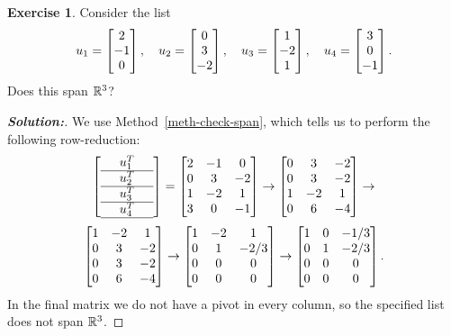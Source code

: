 \documentclass[a4paper]{amsart}
\theoremstyle{definition}
\newtheorem{exercise}{Exercise}
\newenvironment{solution}{\begin{proof}[\textbf{Solution:}] \vphantom{u}}{\end{proof}}
\begin{document}
\begin{exercise}\label{ex-fullspan-i}
 Consider the list
 \[ u_1 = \left[\begin{matrix} 2 \\ -1 \\ 0 \end{matrix}\right], \quad
    u_2 = \left[\begin{matrix} 0 \\ 3 \\ -2 \end{matrix}\right], \quad
    u_3 = \left[\begin{matrix} 1 \\ -2 \\ 1 \end{matrix}\right], \quad
    u_4 = \left[\begin{matrix} 3 \\ 0 \\ -1 \end{matrix}\right]. 
 \]
 Does this span ${\mathbb{R}}^3$?
\end{exercise}
\begin{solution}
 We use Method~\ref{meth-check-span}, which tells us to perform the
 following row-reduction:
 \[ 
   \left[\begin{array}{ccc}
    & u_1^T & \\ \hline
    & u_2^T & \\ \hline
    & u_3^T & \\ \hline
    & u_4^T & \\ \hline
   \end{array}\right]
   = 
   \left[\begin{matrix} 
    2 & -1 &  0 \\
    0 &  3 & -2 \\
    1 & -2 &  1 \\
    3 &  0 & -1 
   \end{matrix}\right] 
   \to 
   \left[\begin{matrix} 
    0 &  3 & -2 \\
    0 &  3 & -2 \\
    1 & -2 &  1 \\
    0 &  6 & -4 
   \end{matrix}\right] 
   \to 
 \] \[
   \left[\begin{matrix} 
    1 & -2 &  1 \\
    0 &  3 & -2 \\
    0 &  3 & -2 \\
    0 &  6 & -4 
   \end{matrix}\right] 
   \to 
   \left[\begin{matrix} 
    1 & -2 &  1 \\
    0 &  1 & -2/3 \\
    0 &  0 & 0 \\
    0 &  0 & 0 
   \end{matrix}\right] 
   \to 
   \left[\begin{matrix} 
    1 &  0 & -1/3 \\
    0 &  1 & -2/3 \\
    0 &  0 & 0 \\
    0 &  0 & 0 
   \end{matrix}\right]. 
 \]
 In the final matrix we do not have a pivot in every column, so the
 specified list does not span ${\mathbb{R}}^3$.  
\end{solution}
\end{document}
